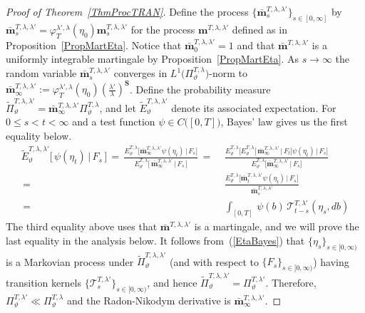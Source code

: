 \documentclass[10pt]{article}
\numberwithin{equation}{section}
\theoremstyle{definition}
\begin{document}
\begin{proof}[Proof of Theorem~\ref{ThmProcTRAN}] Define the process $\{\mathbf{\bar{m}}_s^{T,\lambda,\lambda'}\}_{s\in [0,\infty]}$ by $  \mathbf{\bar{m}}_s^{T,\lambda,\lambda'}=\varphi^{\lambda',\lambda}_T(\eta_0) \mathbf{m}_s^{T,\lambda,\lambda'}  $ for the process $\mathbf{m}^{T,\lambda,\lambda'} $ defined as in  Proposition~\ref{PropMartEta}.  Notice that $\mathbf{\bar{m}}_0^{T,\lambda,\lambda'}=1$ and   that $\mathbf{\bar{m}}^{T,\lambda,\lambda'}$ is a  uniformly integrable martingale by Proposition~\ref{PropMartEta}.  As $s\rightarrow \infty$ the random variable $\mathbf{\bar{m}}_s^{T,\lambda,\lambda'}$ converges  in $L^1\big(\Pi^{T,\lambda}_{\vartheta}\big)$-norm to $\mathbf{\bar{m}}_{\infty}^{T,\lambda,\lambda'}:= \varphi^{\lambda',\lambda}_T(\eta_0)  (\frac{\lambda'}{\lambda})^{\mathbf{S}  }  $.
Define the probability measure $\widetilde{\Pi}^{T,\lambda,\lambda'}_{\vartheta}=\mathbf{\bar{m}}_{\infty}^{T,\lambda,\lambda'}\Pi^{T,\lambda}_{\vartheta}  $, and let $\widetilde{E}^{T,\lambda,\lambda'}_{\vartheta}$ denote its associated expectation.  For $0\leq s<t<\infty$ and a test function $\psi\in C\big([0,T]\big)$, Bayes' law gives us the first equality below.
\begin{align}\label{EtaBayes}
\widetilde{E}^{T,\lambda,\lambda'}_{\vartheta}\big[\,\psi(\eta_t)\,\big|\, F_s \,\big]\,=\,\frac{ E^{T,\lambda }_{\vartheta}\Big[\mathbf{\bar{m}}_{\infty}^{T,\lambda,\lambda'}\psi(\eta_t)\,\Big|\, F_s \Big]  }{ E^{T,\lambda }_{\vartheta}\Big[\,\mathbf{\bar{m}}_{\infty}^{T,\lambda,\lambda'}\,\Big|\, F_s \,\Big] }
\,=\,&\,\frac{ E^{T,\lambda }_{\vartheta}\Big[  E^{T,\lambda }_{\vartheta}\Big[\,\mathbf{\bar{m}}_{\infty}^{T,\lambda,\lambda'}\,\Big|\, F_t \Big]\psi(\eta_t)\,\Big|\, F_s \Big]  }{ E^{T,\lambda }_{\vartheta}\Big[\mathbf{\bar{m}}_{\infty}^{T,\lambda,\lambda'}\,\Big|\, F_s \Big]  }\nonumber \\
\,=\,&\,\frac{ E^{T,\lambda }_{\vartheta}\Big[  \mathbf{\bar{m}}_{t}^{T,\lambda,\lambda'}\psi(\eta_t)\,\Big|\, F_s \Big]  }{ \mathbf{\bar{m}}_{s}^{T,\lambda,\lambda'} }\nonumber \\
\,=\,&\, \int_{[0,T]}\,\psi(b) \,  \mathscr{T}^{T,\lambda'}_{t-s}(\eta_s,db)
\end{align}
The third equality above uses that $\mathbf{\bar{m}}^{T,\lambda,\lambda'}$ is a martingale, and we will prove the last equality in the analysis below.  It follows from~(\ref{EtaBayes}) that $\{\eta_s\}_{s\in [0,\infty)}  $ is a Markovian process under  $\widetilde{\Pi}^{T,\lambda,\lambda'}_{\vartheta}$ (and with respect to $\{F_s\}_{s\in [0,\infty)} $) having  transition kernels $\{ \mathscr{T}^{T,\lambda'}_s \}_{s\in [0,\infty)}  $, and hence  $\widetilde{\Pi}^{T,\lambda,\lambda'}_{\vartheta}=\Pi^{T,\lambda'}_{\vartheta}$.  Therefore, $\Pi^{T,\lambda'}_{\vartheta}\ll \Pi^{T,\lambda}_{\vartheta}$ and the Radon-Nikodym derivative is $\mathbf{\bar{m}}_{\infty}^{T,\lambda,\lambda'}$.


\end{proof}
\end{document}
